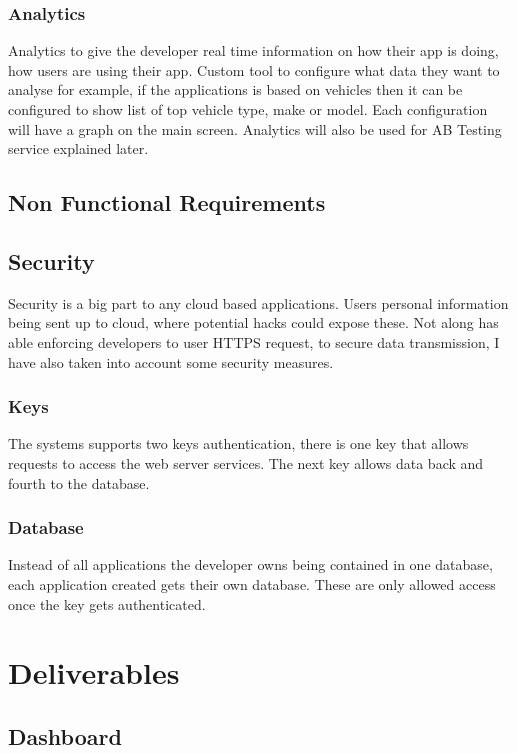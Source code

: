\subsubsection{Analytics}
Analytics to give the developer real time information on how their app is doing, how users are using their app. Custom tool to configure what data they want to analyse for example, if the applications is based on vehicles then it can be configured to show list of top vehicle type, make or model. Each configuration will have a graph on the main screen. Analytics will also be used for AB Testing service explained later.

\subsection{Non Functional Requirements}

\subsection{Security}
Security is a big part to any cloud based applications. Users personal information being sent up to cloud, where potential hacks could expose these. Not along has able enforcing developers to user HTTPS request, to secure data transmission, I have also taken into account some security measures. 

\subsubsection{Keys}
The systems supports two keys authentication, there is one key that allows requests to access the web server services. The next key allows data back and fourth to the database.

\subsubsection{Database}
Instead of all applications the developer owns being contained in one database, each application created gets their own database. These are only allowed access once the key gets authenticated.

\section{Deliverables}

\subsection{Dashboard}

